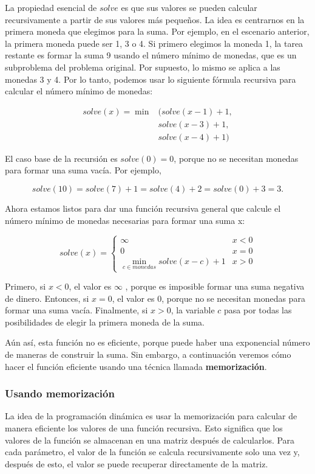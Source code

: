 La propiedad esencial de $solve$ es que sus valores se pueden calcular recursivamente a partir de sus valores más pequeños. La idea es centrarnos en la primera moneda que elegimos para la suma. Por ejemplo, en el escenario anterior, la primera moneda puede ser 1, 3 o 4. Si primero elegimos la moneda 1, la tarea restante es formar la suma 9 usando el número mínimo de monedas, que es un subproblema del problema original. Por supuesto, lo mismo se aplica a las monedas 3 y 4. Por lo tanto, podemos usar lo siguiente fórmula recursiva para calcular el número mínimo de monedas:


$$\begin{matrix}
solve(x) = \min	& (solve(x-1)+1, \\
	& solve(x-3)+1, \\
	& solve(x-4)+1)
\end{matrix}$$



El caso base de la recursión es $solve(0) = 0$, porque no se necesitan monedas para formar una suma vacía. Por ejemplo,

$$solve (10) = solve (7) + 1 = solve (4) + 2 = solve (0) + 3 = 3.$$

Ahora estamos listos para dar una función recursiva general que calcule el número mínimo de monedas necesarias para formar una suma x:

$$solve(x) = \begin{cases}
	\infty & x<0 \\ 
	0 & x=0 \\
	\min_{c \in monedas} solve(x-c)+1 & x>0 
\end{cases}$$

Primero, si $x < 0$, el valor es $\infty$ , porque es imposible formar una suma negativa de dinero. Entonces, si $x = 0$, el valor es 0, porque no se necesitan monedas para formar una suma vacía. Finalmente, si $x > 0$, la variable $c$ pasa por todas las posibilidades de elegir la primera moneda de la suma.

Aún así, esta función no es eficiente, porque puede haber una exponencial
número de maneras de construir la suma. Sin embargo, a continuación veremos cómo hacer el función eficiente usando una técnica llamada \textbf{memorización}.

\subsubsection{Usando memorización}

La idea de la programación dinámica es usar la memorización para calcular de manera eficiente los valores de una función recursiva. Esto significa que los valores de la función se almacenan en una matriz después de calcularlos. Para cada parámetro, el valor de la función se calcula recursivamente solo una vez y, después de esto, el valor se puede recuperar directamente de la matriz.

